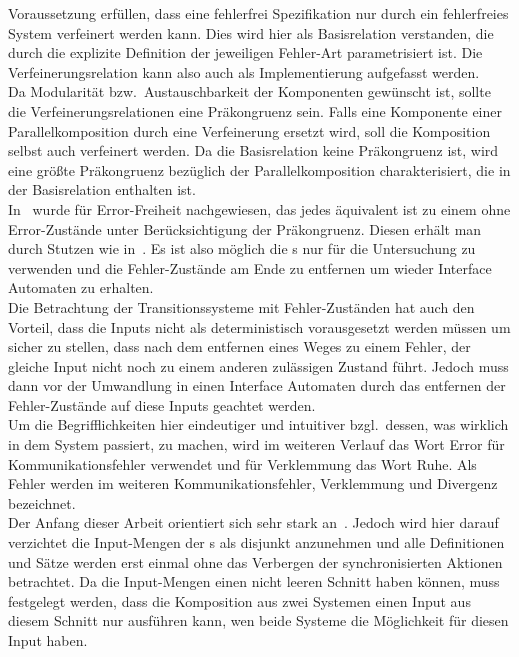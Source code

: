 Voraussetzung erfüllen, dass eine fehlerfrei Spezifikation nur durch ein
fehlerfreies System verfeinert werden kann. Dies wird hier als Basisrelation
verstanden, die durch die explizite Definition der jeweiligen Fehler-Art parametrisiert
ist. Die Verfeinerungsrelation kann also auch als Implementierung aufgefasst
werden.\\
Da Modularität bzw.\ Austauschbarkeit der Komponenten gewünscht ist, sollte die
Verfeinerungsrelationen eine Präkongruenz sein. Falls eine Komponente einer
Parallelkomposition durch eine Verfeinerung ersetzt wird, soll die Komposition
selbst auch verfeinert werden. Da die Basisrelation keine Präkongruenz ist,
wird eine größte Präkongruenz bezüglich der Parallelkomposition
charakterisiert, die in der Basisrelation enthalten ist.\\
In~\cite{Vogler2014EIO} wurde für Error-Freiheit nachgewiesen, das jedes \EIO{}
äquivalent ist zu einem ohne Error-Zustände unter Berücksichtigung der
Präkongruenz. Diesen erhält man durch Stutzen wie in~\cite{Alfaro2004}. Es ist
also möglich die \EIO{}s nur für die Untersuchung zu verwenden und die
Fehler-Zustände am Ende zu entfernen um wieder Interface Automaten zu
erhalten.\\
Die Betrachtung der Transitionssysteme mit Fehler-Zuständen hat auch den
Vorteil, dass die Inputs nicht als deterministisch vorausgesetzt werden müssen
um sicher zu stellen, dass nach dem entfernen eines Weges zu einem Fehler, der
gleiche Input nicht noch zu einem anderen zulässigen Zustand führt. Jedoch muss
dann vor der Umwandlung in einen Interface Automaten durch das entfernen der
Fehler-Zustände auf diese Inputs geachtet werden.\\
Um die Begrifflichkeiten hier eindeutiger und intuitiver bzgl.\ dessen, was
wirklich in dem System passiert, zu machen, wird im weiteren Verlauf
das Wort Error für Kommunikationsfehler verwendet und für Verklemmung das Wort
Ruhe. Als Fehler werden im weiteren Kommunikationsfehler, Verklemmung und
Divergenz bezeichnet.\\
Der Anfang dieser Arbeit orientiert sich sehr stark an~\cite{Vogler2014EIO}.
Jedoch wird hier darauf verzichtet die Input-Mengen der \EIO{}s als disjunkt
anzunehmen und alle Definitionen und Sätze werden erst einmal ohne das
Verbergen der synchronisierten Aktionen betrachtet. Da die Input-Mengen einen
nicht leeren Schnitt haben können, muss festgelegt werden, dass die Komposition
aus zwei Systemen einen Input aus diesem Schnitt nur ausführen kann, wen beide
Systeme die Möglichkeit für diesen Input haben.\\
